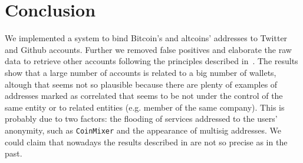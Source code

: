\section{Conclusion} \label{conclusion}
We implemented a system to bind Bitcoin's and altcoins' addresses to Twitter
and Github accounts. Further we removed false positives and elaborate the raw
data to retrieve other accounts following the principles described
in~\cite{bib:fistful}.
The results show that a large number of accounts is related to a big number of
wallets, altough that seems not so plausible because there are plenty of
examples of addresses marked as correlated that seems to be not under the
control of the same entity or to related entities (e.g. member of the same
company). This is probably due to two factors: the flooding of services
addressed to the users' anonymity, such as \texttt{CoinMixer} and the
appearance of multisig addresses. We could claim that nowadays the results
described in \cite{bib:fistful} are not so precise as in the past.